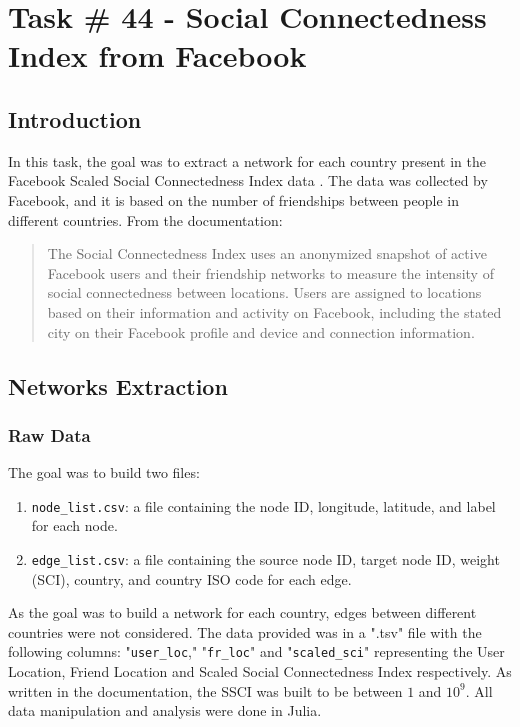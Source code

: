 \chapter{Task \# 44 - Social Connectedness Index  from Facebook}

\section{Introduction}
In this task, the goal was to extract a network for each country present in the Facebook Scaled Social Connectedness Index data \cite{FacebookSocialConnectednessIndexData}.
The data was collected by Facebook, and it is based on the number of friendships between people in different countries.
From the documentation:
\begin{quote}
The Social Connectedness Index uses an anonymized snapshot of active Facebook users and their friendship networks to measure the intensity of social connectedness between locations. Users are assigned to locations based on their information and activity on Facebook, including the stated city on their Facebook profile and device and connection information.
\end{quote}

\section{Networks Extraction}
\subsection{Raw Data}
The goal was to build two files:
\begin{enumerate}
    \item \texttt{node\_list.csv}: a file containing the node ID, longitude, latitude, and label for each node.
    \item \texttt{edge\_list.csv}: a file containing the source node ID, target node ID, weight (SCI), country, and country ISO code for each edge.
\end{enumerate}
As the goal was to build a network for each country, edges between different countries were not considered.
The data provided was in a ".tsv" file with the following columns: "\texttt{user\_loc}," "\texttt{fr\_loc}" and "\texttt{scaled\_sci}" representing the User Location, Friend Location and Scaled Social Connectedness Index respectively.
As written in the documentation, the SSCI was built to be between $1$ and $10^9$.
All data manipulation and analysis were done in Julia\cite{julia}.

